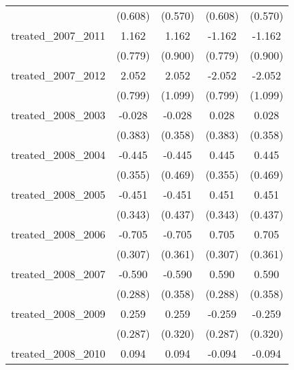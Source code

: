 {\begin{tabular}{l*{4}{c}}
            &     (0.608)         &     (0.570)         &     (0.608)         &     (0.570)         \\
[1em]
treated\_2007\_2011&       1.162         &       1.162         &      -1.162         &      -1.162         \\
            &     (0.779)         &     (0.900)         &     (0.779)         &     (0.900)         \\
[1em]
treated\_2007\_2012&       2.052\sym{*}  &       2.052         &      -2.052\sym{*}  &      -2.052         \\
            &     (0.799)         &     (1.099)         &     (0.799)         &     (1.099)         \\
[1em]
treated\_2008\_2003&      -0.028         &      -0.028         &       0.028         &       0.028         \\
            &     (0.383)         &     (0.358)         &     (0.383)         &     (0.358)         \\
[1em]
treated\_2008\_2004&      -0.445         &      -0.445         &       0.445         &       0.445         \\
            &     (0.355)         &     (0.469)         &     (0.355)         &     (0.469)         \\
[1em]
treated\_2008\_2005&      -0.451         &      -0.451         &       0.451         &       0.451         \\
            &     (0.343)         &     (0.437)         &     (0.343)         &     (0.437)         \\
[1em]
treated\_2008\_2006&      -0.705\sym{*}  &      -0.705         &       0.705\sym{*}  &       0.705         \\
            &     (0.307)         &     (0.361)         &     (0.307)         &     (0.361)         \\
[1em]
treated\_2008\_2007&      -0.590\sym{*}  &      -0.590         &       0.590\sym{*}  &       0.590         \\
            &     (0.288)         &     (0.358)         &     (0.288)         &     (0.358)         \\
[1em]
treated\_2008\_2009&       0.259         &       0.259         &      -0.259         &      -0.259         \\
            &     (0.287)         &     (0.320)         &     (0.287)         &     (0.320)         \\
[1em]
treated\_2008\_2010&       0.094         &       0.094         &      -0.094         &      -0.094         \\

\end{tabular}}

